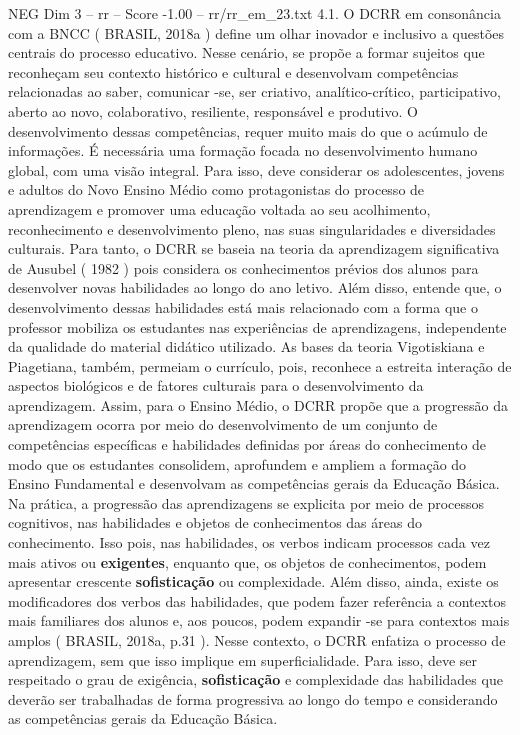 \begin{textsample}{NEG Dim 3 – rr – Score -1.00 – rr/rr\_em\_23.txt}  \label{ex:f3_neg_061}
4.1.
O DCRR em consonância com a BNCC ( BRASIL, 2018a ) define um olhar inovador e inclusivo a questões centrais do processo educativo.
Nesse cenário, se propõe a formar sujeitos que reconheçam seu contexto histórico e cultural e desenvolvam competências relacionadas ao saber, comunicar -se, ser criativo, analítico-crítico, participativo, aberto ao novo, colaborativo, resiliente, responsável e produtivo.
O desenvolvimento dessas competências, requer muito mais do que o acúmulo de informações.
É necessária uma formação focada no desenvolvimento humano global, com uma visão integral.
Para isso, deve considerar os adolescentes, jovens e adultos do Novo Ensino Médio como protagonistas do processo de aprendizagem e promover uma educação voltada ao seu acolhimento, reconhecimento e desenvolvimento pleno, nas suas singularidades e diversidades culturais.
Para tanto, o DCRR se baseia na teoria da aprendizagem significativa de Ausubel ( 1982 ) pois considera os conhecimentos prévios dos alunos para desenvolver novas habilidades ao longo do ano letivo.
Além disso, entende que, o desenvolvimento dessas habilidades está mais relacionado com a forma que o professor mobiliza os estudantes nas experiências de aprendizagens, independente da qualidade do material didático utilizado.
As bases da teoria Vigotiskiana e Piagetiana, também, permeiam o currículo, pois, reconhece a estreita interação de aspectos biológicos e de fatores culturais para o desenvolvimento da aprendizagem.
Assim, para o Ensino Médio, o DCRR propõe que a progressão da aprendizagem ocorra por meio do desenvolvimento de um conjunto de competências específicas e habilidades definidas por áreas do conhecimento de modo que os estudantes consolidem, aprofundem e ampliem a formação do Ensino Fundamental e desenvolvam as competências gerais da Educação Básica.
Na prática, a progressão das aprendizagens se explicita por meio de processos cognitivos, nas habilidades e objetos de conhecimentos das áreas do conhecimento.
Isso pois, nas habilidades, os verbos indicam processos cada vez mais ativos ou \textbf{exigentes}, enquanto que, os objetos de conhecimentos, podem apresentar crescente \textbf{sofisticação} ou complexidade.
Além disso, ainda, existe os modificadores dos verbos das habilidades, que podem fazer referência a contextos mais familiares dos alunos e, aos poucos, podem expandir -se para contextos mais amplos ( BRASIL, 2018a, p.31 ).
Nesse contexto, o DCRR enfatiza o processo de aprendizagem, sem que isso implique em superficialidade.
Para isso, deve ser respeitado o grau de exigência, \textbf{sofisticação} e complexidade das habilidades que deverão ser trabalhadas de forma progressiva ao longo do tempo e considerando as competências gerais da Educação Básica.

\end{textsample}
